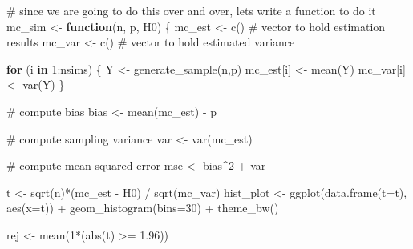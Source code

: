 \documentclass[
  letterpaper,
  DIV=11,
  numbers=noendperiod]{scrreprt}
\newenvironment{Shaded}{\begin{snugshade}}{\end{snugshade}}
\newcommand{\AttributeTok}[1]{\textcolor[rgb]{0.40,0.45,0.13}{#1}}
\newcommand{\CommentTok}[1]{\textcolor[rgb]{0.37,0.37,0.37}{#1}}
\newcommand{\ControlFlowTok}[1]{\textcolor[rgb]{0.00,0.23,0.31}{\textbf{#1}}}
\newcommand{\DecValTok}[1]{\textcolor[rgb]{0.68,0.00,0.00}{#1}}
\newcommand{\FloatTok}[1]{\textcolor[rgb]{0.68,0.00,0.00}{#1}}
\newcommand{\FunctionTok}[1]{\textcolor[rgb]{0.28,0.35,0.67}{#1}}
\newcommand{\NormalTok}[1]{\textcolor[rgb]{0.00,0.23,0.31}{#1}}
\newcommand{\OtherTok}[1]{\textcolor[rgb]{0.00,0.23,0.31}{#1}}
\newcommand{\SpecialCharTok}[1]{\textcolor[rgb]{0.37,0.37,0.37}{#1}}
\begin{document}
\begin{Shaded}
\begin{Highlighting}[]
\CommentTok{\# since we are going to do this over and over, let\textquotesingle{}s write a function to do it}
\NormalTok{mc\_sim }\OtherTok{\textless{}{-}} \ControlFlowTok{function}\NormalTok{(n, p, H0) \{}
\NormalTok{  mc\_est }\OtherTok{\textless{}{-}} \FunctionTok{c}\NormalTok{()  }\CommentTok{\# vector to hold estimation results}
\NormalTok{  mc\_var }\OtherTok{\textless{}{-}} \FunctionTok{c}\NormalTok{()  }\CommentTok{\# vector to hold estimated variance}

  \ControlFlowTok{for}\NormalTok{ (i }\ControlFlowTok{in} \DecValTok{1}\SpecialCharTok{:}\NormalTok{nsims) \{}
\NormalTok{    Y }\OtherTok{\textless{}{-}} \FunctionTok{generate\_sample}\NormalTok{(n,p)}
\NormalTok{    mc\_est[i] }\OtherTok{\textless{}{-}} \FunctionTok{mean}\NormalTok{(Y)}
\NormalTok{    mc\_var[i] }\OtherTok{\textless{}{-}} \FunctionTok{var}\NormalTok{(Y)}
\NormalTok{  \}}

  \CommentTok{\# compute bias}
\NormalTok{  bias }\OtherTok{\textless{}{-}} \FunctionTok{mean}\NormalTok{(mc\_est) }\SpecialCharTok{{-}}\NormalTok{ p}

  \CommentTok{\# compute sampling variance}
\NormalTok{  var }\OtherTok{\textless{}{-}} \FunctionTok{var}\NormalTok{(mc\_est)}

  \CommentTok{\# compute mean squared error}
\NormalTok{  mse }\OtherTok{\textless{}{-}}\NormalTok{ bias}\SpecialCharTok{\^{}}\DecValTok{2} \SpecialCharTok{+}\NormalTok{ var}
  
\NormalTok{  t }\OtherTok{\textless{}{-}} \FunctionTok{sqrt}\NormalTok{(n)}\SpecialCharTok{*}\NormalTok{(mc\_est }\SpecialCharTok{{-}}\NormalTok{ H0) }\SpecialCharTok{/} \FunctionTok{sqrt}\NormalTok{(mc\_var)}
\NormalTok{  hist\_plot }\OtherTok{\textless{}{-}} \FunctionTok{ggplot}\NormalTok{(}\FunctionTok{data.frame}\NormalTok{(}\AttributeTok{t=}\NormalTok{t), }\FunctionTok{aes}\NormalTok{(}\AttributeTok{x=}\NormalTok{t)) }\SpecialCharTok{+}
    \FunctionTok{geom\_histogram}\NormalTok{(}\AttributeTok{bins=}\DecValTok{30}\NormalTok{) }\SpecialCharTok{+} 
    \FunctionTok{theme\_bw}\NormalTok{()}

\NormalTok{  rej }\OtherTok{\textless{}{-}} \FunctionTok{mean}\NormalTok{(}\DecValTok{1}\SpecialCharTok{*}\NormalTok{(}\FunctionTok{abs}\NormalTok{(t) }\SpecialCharTok{\textgreater{}=} \FloatTok{1.96}\NormalTok{))}
  

\end{Highlighting}
\end{Shaded}
\end{document}
